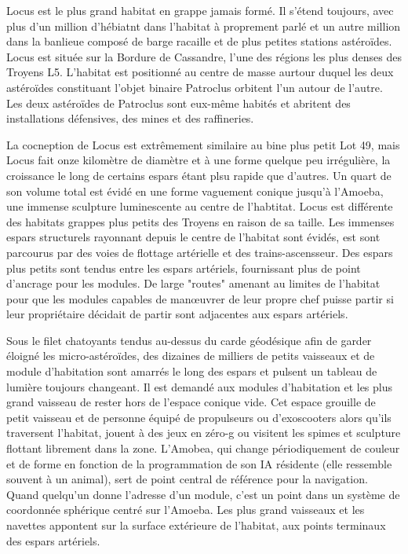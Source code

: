 Locus est le plus grand habitat en grappe jamais formé. Il s'étend toujours, avec plus d'un million d'hébiatnt dans l'habitat à proprement parlé et un autre million dans la banlieue composé de barge racaille et de plus petites stations astéroïdes. Locus est située sur la Bordure de Cassandre, l'une des régions les plus denses des Troyens L5. L'habitat est positionné au centre de masse aurtour duquel les deux astéroïdes constituant l'objet binaire Patroclus orbitent l'un autour de l'autre. Les deux astéroïdes de Patroclus sont eux-même habités et abritent des installations défensives, des mines et des raffineries. 

La cocneption de Locus est extrêmement similaire au bine plus petit Lot 49, mais Locus fait onze kilomètre de diamètre et à une forme quelque peu irrégulière, la croissance le long de certains espars étant plsu rapide que d'autres. Un quart de son volume total est évidé en une forme vaguement conique jusqu'à l'Amoeba, une immense sculpture luminescente au centre de l'habtitat. Locus est différente des habitats grappes plus petits des Troyens en raison de sa taille. Les immenses espars structurels rayonnant depuis le centre de l'habitat sont évidés, est sont parcourus par des voies de flottage artérielle et des trains-ascensseur. Des espars plus petits sont tendus entre les espars artériels, fournissant plus de point d'ancrage pour les modules. De large "routes" amenant au limites de l'habitat pour que les modules capables de manœuvrer de leur propre chef puisse partir si leur propriétaire décidait de partir sont adjacentes aux espars artériels. 

Sous le  filet chatoyants tendus au-dessus du carde géodésique afin de garder éloigné les micro-astéroïdes, des dizaines de milliers de petits vaisseaux et de module d'habitation sont amarrés le long des espars et pulsent un tableau de lumière toujours changeant. Il est demandé aux modules d'habitation et les plus grand vaisseau de rester hors de l'espace conique vide. Cet espace grouille de petit vaisseau et de personne équipé de propulseurs ou d'exoscooters alors qu'ils traversent l'habitat, jouent à des jeux en zéro-g ou visitent les spimes et sculpture flottant librement dans la zone. L'Amobea, qui change périodiquement de couleur et de forme en fonction de la programmation de son IA résidente (elle ressemble souvent à un animal), sert de point central de référence pour la navigation. Quand quelqu'un donne l'adresse d'un module, c'est un point dans un système de coordonnée sphérique centré sur l'Amoeba. Les plus grand vaisseaux et les navettes appontent sur la surface extérieure de l'habitat, aux points terminaux des espars artériels. 

